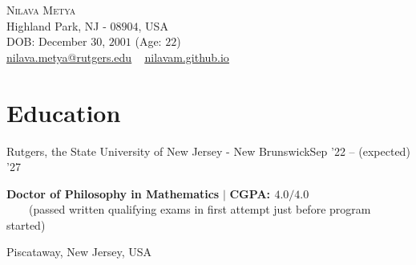 
\usepackage{tabto}
\usepackage{setspace}
\usepackage{etaremune}
\usepackage{xcolor}
\newcommand*\circled[1]{\tikz[baseline=(char.base)]{
            \node[shape=circle,draw,inner sep=1pt, line width=1.1pt] (char) {#1};}}





\begin{center}
    {\Huge \scshape Nilava Metya} \\ \vspace{1pt}
    Highland Park, NJ - $08904$, USA\\
    DOB: December $30$, $2001$ (Age: $22$)\\ \vspace{1pt}
{\small 
\href{mailto:nilava.metya@rutgers.edu}{\circled{\scriptsize\faEnvelope}  \underline{nilava.metya@rutgers.edu}} ~ 
{\circled{\scriptsize\faHome} \underline{\url{nilavam.github.io}}}}
\end{center}



\section{Education}
\resumeSubheading
{Rutgers, the State University of New Jersey - New Brunswick}{Sep '22 -- (expected) '27}
{\begin{minipage}{15cm} \color{grey}\textbf{Doctor of Philosophy in Mathematics}  $|$ \textbf{CGPA: $4.0/4.0$}\\
$\phantom{\qquad}$(passed written qualifying exams in first attempt just before program started) \end{minipage}
}{Piscataway, New Jersey, USA}
\vspace{-5pt}


